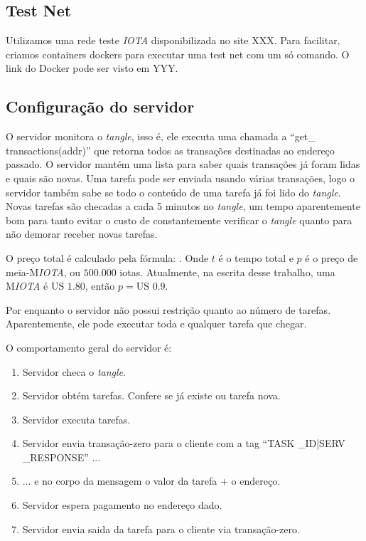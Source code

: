 \documentclass[a4paper]{article}
\begin{document}
\subsection{Test Net}

Utilizamos uma rede teste \textit{IOTA} disponibilizada no site XXX. Para facilitar, criamos containers dockers para executar uma test
net com um só comando. O link do Docker pode ser visto em YYY.

\subsection{Configuração do servidor}

O servidor monitora o \textit{tangle}, isso é, ele executa uma chamada a ``get\_ transactions(addr)'' que retorna todos as transações destinadas
ao endereço passado. O servidor mantém uma lista para saber quais transações já foram lidas e quais são novas. Uma tarefa pode ser enviada
usando várias transações, logo o servidor também sabe se todo o conteúdo de uma tarefa já foi lido do \textit{tangle}. Novas tarefas são checadas a cada
5 minutos no \textit{tangle}, um tempo aparentemente bom para tanto evitar o custo de constantemente verificar o \textit{tangle} quanto para não demorar receber novas tarefas.

O preço total é calculado pela fórmula: . Onde $t$ é o tempo total e $p$ é o preço de meia-M\textit{IOTA}, ou $500.000$ iotas.
Atualmente, na escrita desse trabalho, uma M\textit{IOTA} é $\text{US }1.80$, então $p = \text{US }0.9$.

Por enquanto o servidor não possui restrição quanto ao número de tarefas. Aparentemente, ele pode executar toda e qualquer tarefa que chegar.

O comportamento geral do servidor é:

\begin{enumerate}
\item Servidor checa o \textit{tangle}.
\item Servidor obtém tarefas. Confere se já existe ou tarefa nova.
\item Servidor executa tarefas.
\item Servidor envia transação-zero para o cliente com a tag ``TASK \_ID|SERV \_RESPONSE'' ...
\item ... e no corpo da mensagem o valor da tarefa + o endereço.
\item Servidor espera pagamento no endereço dado.
\item Servidor envia saida da tarefa para o cliente via transação-zero.
\end{enumerate}
\end{document}

